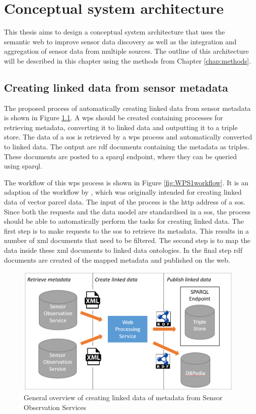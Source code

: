 

\chapter{Conceptual system architecture}
\label{chap:design}

This thesis aims to design a conceptual system architecture that uses the semantic web to improve sensor data discovery as well as the integration and aggregation of sensor data from multiple sources. The outline of this architecture will be described in this chapter using the methods from Chapter \ref{chap:methods}. 

\section{Creating linked data from sensor metadata}
\label{par:Architecture1}
The proposed process of automatically creating linked data from sensor metadata is shown in Figure \ref{fig:WPS1}. A \acf{wps} should be created containing processes for retrieving metadata, converting it to linked data and outputting it to a triple store. The data of a \ac{sos} is retrieved by a \ac{wps} process and automatically converted to linked data. The output are \ac{rdf} documents containing the metadata as triples. These documents are posted to a \ac{sparql} endpoint, where they can be queried using \ac{sparql}.  

The workflow of this \ac{wps} process is shown in Figure \ref{fig:WPS1workflow}. It is an adaption of the workflow by \cite{LD:Missier}, which was originally intended for creating linked data of vector parcel data. The input of the process is the \ac{http} address of a \ac{sos}. Since both the requests and the data model are standardised in a \ac{sos}, the process should be able to automatically perform the tasks for creating linked data. The first step is to make requests to the \ac{sos} to retrieve its metadata. This results in a number of \ac{xml} documents that need to be filtered. The second step is to map the data inside these \ac{xml} documents to linked data ontologies. In the final step \ac{rdf} documents are created of the mapped metadata and published on the web.  

\begin{figure}
	\centering
	\includegraphics[width=0.8\linewidth]{UML/wps1diagram2.PNG}
	\caption{General overview of creating linked data of metadata from Sensor Observation Services}
	\label{fig:WPS1}
\end{figure}

